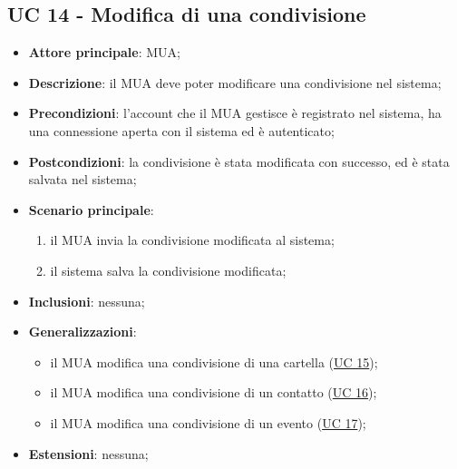 \subsection{UC 14 - Modifica di una condivisione} \label{sec:UC14}
    \begin{itemize}
        \item \textbf{Attore principale}: MUA;
        \item \textbf{Descrizione}: il MUA deve poter modificare una condivisione nel sistema;
        \item \textbf{Precondizioni}: l’account che il MUA gestisce è registrato nel sistema, ha una connessione aperta con il sistema ed è autenticato;
        \item \textbf{Postcondizioni}: la condivisione è stata modificata con successo, ed è stata salvata nel sistema;
        \item \textbf{Scenario principale}:
            \begin{enumerate}
                \item il MUA invia la condivisione modificata al sistema;
                \item il sistema salva la condivisione modificata;
            \end{enumerate}
        \item \textbf{Inclusioni}: nessuna;
        \item \textbf{Generalizzazioni}:
            \begin{itemize}
                \item il MUA modifica una condivisione di una cartella (\hyperref[sec:UC15]{UC 15});
                \item il MUA modifica una condivisione di un contatto (\hyperref[sec:UC16]{UC 16});
                \item il MUA modifica una condivisione di un evento (\hyperref[sec:UC17]{UC 17});
            \end{itemize}
        \item \textbf{Estensioni}: nessuna;
    \end{itemize}